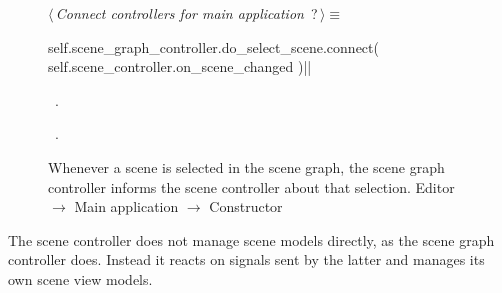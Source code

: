 \documentclass[%
    a4paper,    %
    justified,  %
    nobib,      %
    openany     %
]{tufte-book}
\makeatletter
\renewcommand{\label}[1]{\@tufte@label{##1}}%
\makeatother
\begin{document}
\begin{figure}
\begin{flushleft} \small
\begin{minipage}{\linewidth}\label{scrap85}\raggedright\small
{} $\langle\,${\itshape Connect controllers for main application}\nobreak\ {\footnotesize {?}}$\,\rangle\equiv$
\vspace{-1ex}
\begin{pythoncode}
self.scene_graph_controller.do_select_scene.connect(
    self.scene_controller.on_scene_changed
)|\NWsep|
\end{pythoncode}
\vspace{1.5ex}
\footnotesize
\begin{list}{}{\setlength{\itemsep}{-\parsep}\setlength{\itemindent}{-\leftmargin}}
\item \NWtxtMacroDefBy\ .
\item \NWtxtMacroRefIn\ .

\item{}
\end{list}
\end{minipage}\vspace{4ex}
\end{flushleft}
\caption{Whenever a scene is selected in the scene graph, the scene graph
  controller informs the scene controller about that selection.
  \newline{}\newline{}Editor $\rightarrow$ Main application $\rightarrow$
  Constructor}
\label{editor:lst:main-application:constructor:connect-scene-controllers-select}
\end{figure}

The scene controller does not manage scene models directly, as the scene graph
controller does. Instead it reacts on signals sent by the latter and manages
its own scene view models.
\end{document}
